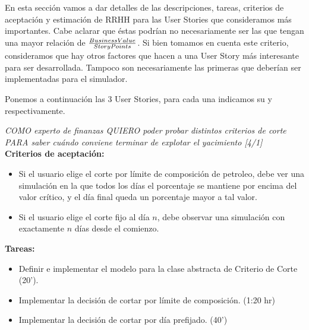 En esta sección vamos a dar detalles de las descripciones, tareas, criterios de aceptación y estimación de RRHH para las User Stories que consideramos más importantes. Cabe aclarar que éstas podrían no necesariamente ser las que tengan una mayor relación de \( \frac{Business Value{}}{Story Points{}} \). Si bien tomamos en cuenta este criterio, consideramos que hay otros factores que hacen a una User Story más interesante para ser desarrollada. Tampoco son necesariamente las primeras que deberían ser implementadas para el simulador. 

Ponemos a continuación las 3 User Stories, para cada una indicamos su
\BV{} y \SP{} respectivamente.

\begin{tcolorbox}
\textit{COMO experto de finanzas QUIERO poder probar distintos criterios de corte PARA saber cuándo conviene terminar de explotar el yacimiento [4/1]}\\

\textbf{Criterios de aceptación:}
\begin{itemize}
	\item Si el usuario elige el corte por límite de composición de petroleo, debe ver una simulación en la que todos los días el porcentaje se mantiene por encima del valor crítico, y el día final queda un porcentaje mayor a tal valor.
    \item Si el usuario elige el corte fijo al día $n$, debe observar una simulación con exactamente $n$ días desde el comienzo.
\end{itemize}

\textbf{Tareas:}
\begin{itemize}
	\item Definir e implementar el modelo para la clase abstracta de
    Criterio de Corte (20').
    \item Implementar la decisión de cortar por límite de composición. (1:20 hr)
    \item Implementar la decisión de cortar por día prefijado. (40')
\end{itemize}
\end{tcolorbox}

